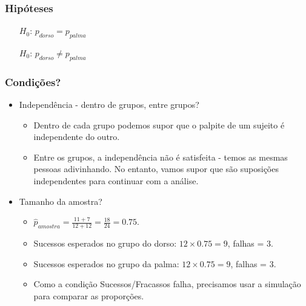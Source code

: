 
\begin{frame}
\frametitle{Hipóteses}
\justifying
{}

\begin{itemize}
\item[$H_0$:] $p_{dorso} = p_{palma}$
\item[$H_0$:] $p_{dorso} \ne p_{palma}$
\end{itemize}

\end{frame}


\begin{frame}
\frametitle{Condições?}

\begin{itemize}
\justifying
\item Independência - dentro de grupos, entre grupos?
\begin{itemize}
\justifying
\item Dentro de cada grupo podemos supor que o palpite de um sujeito é independente do outro.
\justifying
\item Entre os grupos, a independência não é satisfeita - temos as mesmas pessoas adivinhando. No entanto, vamos supor que são suposições independentes para continuar com a análise.
\end{itemize}
\justifying
\item Tamanho da amostra?
\begin{itemize}
\justifying
\item $\hat{p}_{amostra} = \frac{11 + 7}{12 + 12} = \frac{18}{24} = 0.75$.
\justifying
\item Sucessos esperados no grupo do dorso: $ 12 \times 0.75 = 9 $, falhas = 3.
\justifying
\item Sucessos esperados no grupo da palma: $ 12 \times 0.75 = 9 $, falhas = 3.
\justifying
\item Como a condição Sucessos/Fracassos falha, precisamos usar a simulação para comparar as proporções.
\end{itemize}

\end{itemize}

\end{frame}

